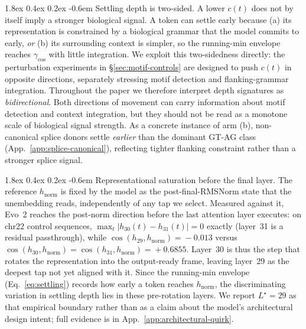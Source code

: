 \documentclass{article}
\makeatletter
\renewcommand\paragraph{\@startsection{paragraph}{4}{\z@}%
  {1.8ex \@plus 0.4ex \@minus 0.2ex}%
  {-0.6em}%
{\normalfont\normalsize\bfseries}}
\theoremstyle{plain}
\theoremstyle{definition}
\theoremstyle{remark}
\newcommand{\hnorm}{h_{\mathrm{norm}}}
\makeatother
\begin{document}
\paragraph{Settling depth is two-sided.} A lower $c(t)$ does not by itself imply a stronger biological signal. A token can settle early because (a) its representation is constrained by a biological grammar that the model commits to early, \emph{or} (b) its surrounding context is simpler, so the running-min envelope reaches $\gamma_{\cos}$ with little integration. We exploit this two-sidedness directly: the perturbation experiments in \S\ref{sec:motif-controls} are designed to push $c(t)$ in opposite directions, separately stressing motif detection and flanking-grammar integration. Throughout the paper we therefore interpret depth signatures as \emph{bidirectional}. Both directions of movement can carry information about motif detection and context integration, but they should not be read as a monotone scale of biological signal strength.
As a concrete instance of arm (b), non-canonical splice donors settle \emph{earlier} than the dominant GT-AG class (App.~\ref{app:splice-canonical}), reflecting tighter flanking constraint rather than a stronger splice signal.

\paragraph{Representational saturation before the final layer.} The reference $\hnorm$ is fixed by the model as the post-final-RMSNorm state that the unembedding reads, independently of any tap we select. Measured against it, Evo~2 reaches the post-norm direction before the last attention layer executes: on chr22 control sequences, $\max_{t}|h_{30}(t)\!-\!h_{31}(t)|\!=\!0$ exactly (layer~31 is a residual passthrough), while $\cos(h_{29},\hnorm)\!=\!-0.013$ versus $\cos(h_{30},\hnorm)\!=\!\cos(h_{31},\hnorm)\!=\!+0.6855$. Layer~30 is thus the step that rotates the representation into the output-ready frame, leaving layer~29 as the deepest tap not yet aligned with it. Since the running-min envelope (Eq.~\ref{eq:settling}) records how early a token reaches $\hnorm$, the discriminating variation in settling depth lies in these pre-rotation layers. We report $L^\star\!=\!29$ as that empirical boundary rather than as a claim about the model's architectural design intent; full evidence is in App.~\ref{app:architectural-quirk}.
\end{document}

